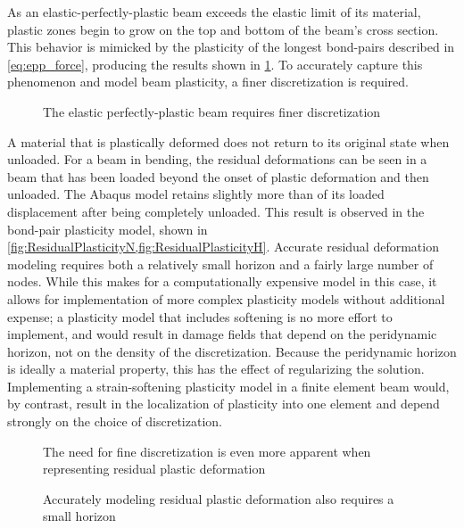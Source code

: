 As an elastic-perfectly-plastic beam exceeds the elastic limit of its material, plastic zones begin to grow on the top and bottom of the beam's cross section.
This behavior is mimicked by the plasticity of the longest bond-pairs described in \cref{eq:epp_force}, producing the results shown in \cref{fig:eppu_h10_g2000}.
To accurately capture this phenomenon and model beam plasticity, a finer discretization is required.
\begin{figure}[h]
  \centering
  \resizebox{0.6\linewidth}{!}{}
  \caption{The elastic perfectly-plastic beam requires finer discretization}
  \label{fig:eppu_h10_g2000}
\end{figure}

A material that is plastically deformed does not return to its original state when unloaded.
For a beam in bending, the residual deformations can be seen in a beam that has been loaded beyond the onset of plastic deformation and then unloaded.
The Abaqus model retains slightly more than  of its loaded displacement after being completely unloaded.
This result is observed in the bond-pair plasticity model, shown in \cref{fig:ResidualPlasticityN,fig:ResidualPlasticityH}. 
Accurate residual deformation modeling requires both a relatively small horizon and a fairly large number of nodes.
While this makes for a computationally expensive model in this case, it allows for implementation of more complex plasticity models without additional expense; a plasticity model that includes softening is no more effort to implement, and would result in damage fields that depend on the peridynamic horizon, not on the density of the discretization.
Because the peridynamic horizon is ideally a material property, this has the effect of regularizing the solution.
Implementing a strain-softening plasticity model in a finite element beam would, by contrast, result in the localization of plasticity into one element and depend strongly on the choice of discretization.

%
\begin{figure}[h]
  \centering
  \resizebox{0.6\linewidth}{!}{}
  \caption{The need for fine discretization is even more apparent when representing residual plastic deformation}
  \label{fig:ResidualPlasticityN}
\end{figure}
%
\begin{figure}[h]
  \centering
  \resizebox{0.6\linewidth}{!}{}
  \caption{Accurately modeling residual plastic deformation also requires a small horizon}
  \label{fig:ResidualPlasticityH}
\end{figure}


